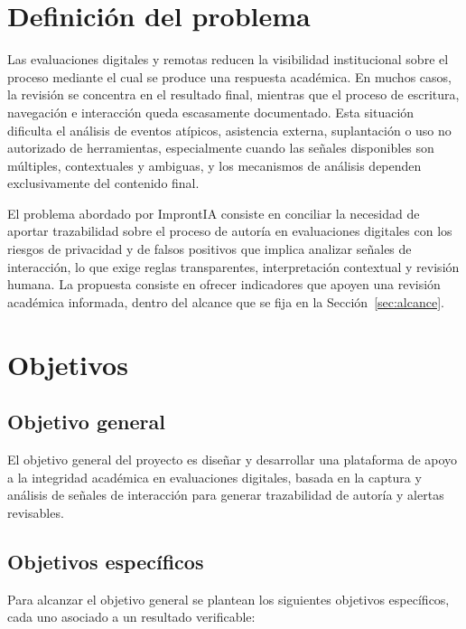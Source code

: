 \section{Definición del problema}
\label{ch:problema}
Las evaluaciones digitales y remotas reducen la visibilidad institucional sobre el proceso mediante el cual se produce una respuesta académica. En muchos casos, la revisión se concentra en el resultado final, mientras que el proceso de escritura, navegación e interacción queda escasamente documentado. Esta situación dificulta el análisis de eventos atípicos, asistencia externa, suplantación o uso no autorizado de herramientas, especialmente cuando las señales disponibles son múltiples, contextuales y ambiguas, y los mecanismos de análisis dependen exclusivamente del contenido final.

El problema abordado por ImprontIA consiste en conciliar la necesidad de aportar trazabilidad sobre el proceso de autoría en evaluaciones digitales con los riesgos de privacidad y de falsos positivos que implica analizar señales de interacción, lo que exige reglas transparentes, interpretación contextual y revisión humana. La propuesta consiste en ofrecer indicadores que apoyen una revisión académica informada, dentro del alcance que se fija en la Sección~\ref{sec:alcance}.

\section{Objetivos}
\label{sec:objetivos}

\subsection{Objetivo general}

El objetivo general del proyecto es diseñar y desarrollar una plataforma de apoyo a la integridad académica en evaluaciones digitales, basada en la captura y análisis de señales de interacción para generar trazabilidad de autoría y alertas revisables.

\subsection{Objetivos específicos}

Para alcanzar el objetivo general se plantean los siguientes objetivos específicos, cada uno asociado a un resultado verificable:

